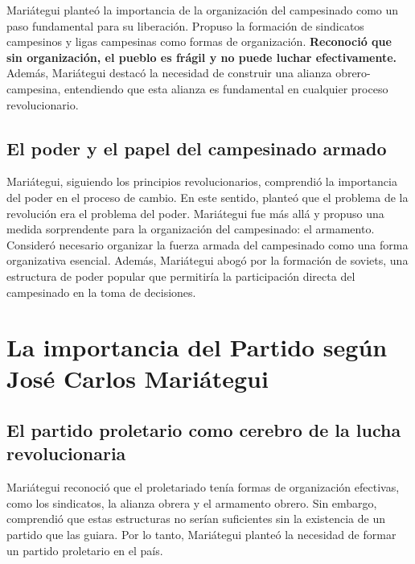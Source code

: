 \documentclass[
  letterpaper,
  DIV=11,
  numbers=noendperiod]{scrartcl}
\begin{document}
Mariátegui planteó la importancia de la organización del campesinado
como un paso fundamental para su liberación. Propuso la formación de
sindicatos campesinos y ligas campesinas como formas de organización.
\textbf{Reconoció que sin organización, el pueblo es frágil y no puede
luchar efectivamente.} Además, Mariátegui destacó la necesidad de
construir una alianza obrero-campesina, entendiendo que esta alianza es
fundamental en cualquier proceso revolucionario.

\hypertarget{el-poder-y-el-papel-del-campesinado-armado}{%
\subsection{El poder y el papel del campesinado
armado}\label{el-poder-y-el-papel-del-campesinado-armado}}

Mariátegui, siguiendo los principios revolucionarios, comprendió la
importancia del poder en el proceso de cambio. En este sentido, planteó
que el problema de la revolución era el problema del poder. Mariátegui
fue más allá y propuso una medida sorprendente para la organización del
campesinado: el armamento. Consideró necesario organizar la fuerza
armada del campesinado como una forma organizativa esencial. Además,
Mariátegui abogó por la formación de soviets, una estructura de poder
popular que permitiría la participación directa del campesinado en la
toma de decisiones.

\hypertarget{la-importancia-del-partido-seguxfan-josuxe9-carlos-mariuxe1tegui}{%
\section{La importancia del Partido según José Carlos
Mariátegui}\label{la-importancia-del-partido-seguxfan-josuxe9-carlos-mariuxe1tegui}}

\hypertarget{el-partido-proletario-como-cerebro-de-la-lucha-revolucionaria}{%
\subsection{El partido proletario como cerebro de la lucha
revolucionaria}\label{el-partido-proletario-como-cerebro-de-la-lucha-revolucionaria}}

Mariátegui reconoció que el proletariado tenía formas de organización
efectivas, como los sindicatos, la alianza obrera y el armamento obrero.
Sin embargo, comprendió que estas estructuras no serían suficientes sin
la existencia de un partido que las guiara. Por lo tanto, Mariátegui
planteó la necesidad de formar un partido proletario en el país.
\end{document}
